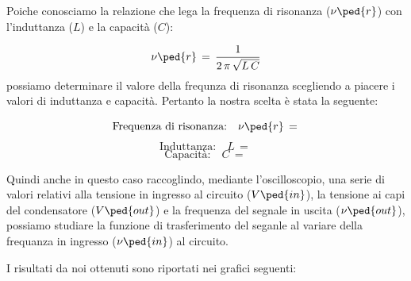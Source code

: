 Poiche conosciamo la relazione che lega la frequenza di risonanza ($\nu\ped{r}$) con l'induttanza ($L$) e la capacità ($C$):

\begin{equation}
	\nu\ped{r} \,=\, \frac{1}{2\,\pi\,\sqrt{L\,C}}
	\label{eq:risonanza banda}
\end{equation}
%
possiamo determinare il valore della frequnza di risonanza scegliendo a piacere i valori di induttanza e capacità. Pertanto la nostra scelta è stata la seguente:

\begin{equation*}
	\text{Frequenza di risonanza:} \quad \nu\ped{r} \,=\,
\end{equation*}
\begin{equation*}
	\text{Induttanza:} \quad L \,=\,
\end{equation*}
\begin{equation*}
	\text{Capacità:} \quad C \,=\,
\end{equation*}

Quindi anche in questo caso raccoglindo, mediante l'oscilloscopio, una serie di valori relativi alla tensione in ingresso al circuito ($V\ped{in}$), la tensione ai capi del condensatore ($V\ped{out}$) e la frequenza del segnale in uscita ($\nu\ped{out}$), possiamo studiare la funzione di trasferimento del seganle al variare della frequanza in ingresso ($\nu\ped{in}$) al circuito.

I risultati da noi ottenuti sono riportati nei grafici seguenti:

